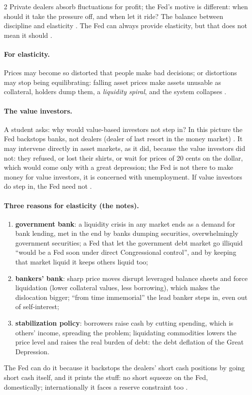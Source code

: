 \begin{paracol}{2}
Private dealers absorb fluctuations for profit; the Fed's motive is different: when should it take the pressure off, and when let it ride? The balance between discipline and
elasticity . The Fed can always provide elasticity, but that does not mean it should .

\paragraph{For elasticity.} Prices may become so distorted that people make bad decisions; or distortions may stop being equilibrating: falling asset prices make assets
unusable as collateral, holders dump them, a \emph{liquidity spiral}, and the system collapses .

\paragraph{The value investors.} A student asks: why would value-based investors not step in? In this picture the Fed backstops banks, not dealers (dealer of last resort in
the money market) . It may intervene directly in asset markets, as it did, because the value investors did not: they refused, or lost their shirts,
or wait for prices of 20 cents on the dollar, which would come only with a great depression; the Fed is not there to make money for value investors, it is concerned with
unemployment. If value investors do step in, the Fed need not .

\paragraph{Three reasons for elasticity (the notes).} 
\begin{enumerate}
  \item \textbf{government bank}: a liquidity crisis in any market ends as a demand for bank lending, met in the end by banks dumping securities, overwhelmingly government securities; a
        Fed that let the government debt market go illiquid ``would be a Fed soon under direct Congressional control'', and by keeping that market liquid it keeps others liquid too;
  \item \textbf{bankers' bank}: sharp price moves disrupt leveraged balance sheets and force liquidation (lower collateral values, less borrowing), which makes the dislocation bigger;
        ``from time immemorial'' the lead banker steps in, even out of self-interest;
  \item \textbf{stabilization policy}: borrowers raise cash by cutting spending, which is others' income, spreading the problem; liquidating commodities lowers the price level and raises the
        real burden of debt: the debt deflation of the Great Depression.
\end{enumerate}
The Fed can do it because it backstops the dealers' short cash positions by going short cash itself, and it prints the stuff: no short squeeze on the Fed, domestically; internationally it
faces a reserve constraint too .


\end{paracol}
